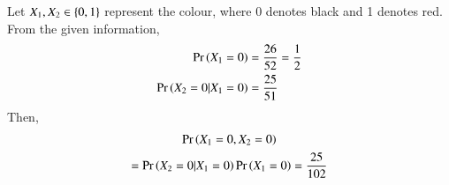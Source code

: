 Let $X_1,X_2 \in \left\{0,1\right\}$ represent the colour, where 0 denotes black and 1 denotes red.  From the given information,
\begin{align}
\Pr\left(X_1 = 0\right) &= \frac{26}{52}= \frac{1}{2}
\\
\Pr\left(X_2 = 0|X_1 = 0\right) &= \frac{25}{51}
\end{align}
Then,
\begin{multline}
\Pr\left(X_1=0,X_2=0\right) 
\\
= \Pr\left(X_2 = 0|X_1 = 0\right)\Pr\left(X_1 = 0\right)
 = \frac{25}{102}
\end{multline}
